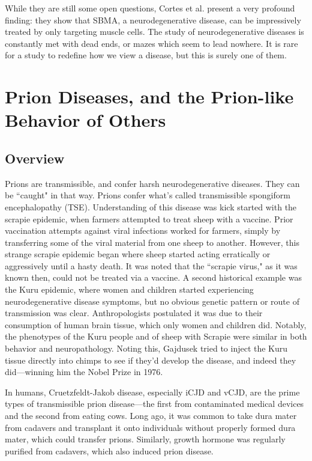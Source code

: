 While they are still some open questions, Cortes et al. present a very profound finding: they show that SBMA, a neurodegenerative disease, can be impressively treated by only targeting muscle cells. The study of neurodegenerative diseases is constantly met with dead ends, or mazes which seem to lead nowhere. It is rare for a study to redefine how we view a disease, but this is surely one of them.




\section{Prion Diseases, and the Prion-like Behavior of Others}

\subsection*{Overview}

Prions are transmissible, and confer harsh neurodegenerative diseases. They can be ``caught" in that way. Prions confer what's called transmissible spongiform encephalopathy (TSE). Understanding of this disease was kick started with the scrapie epidemic, when farmers attempted to treat sheep with a vaccine. Prior vaccination attempts against viral infections worked for farmers, simply by transferring some of the viral material from one sheep to another. However, this strange scrapie epidemic began where sheep started acting erratically or aggressively until a hasty death. It was noted that the ``scrapie virus," as it was known then, could not be treated via a vaccine. A second historical example was the Kuru epidemic, where women and children started experiencing neurodegenerative disease symptoms, but no obvious genetic pattern or route of transmission was clear. Anthropologists postulated it was due to their consumption of human brain tissue, which only women and children did. Notably, the phenotypes of the Kuru people and of sheep with Scrapie were similar in both behavior and neuropathology. Noting this, Gajdusek tried to inject the Kuru tissue directly into chimps to see if they'd develop the disease, and indeed they did---winning him the Nobel Prize in 1976.\newline

In humans, Cruetzfeldt-Jakob disease, especially iCJD and vCJD, are the prime types of transmissible prion disease---the first from contaminated medical devices and the second from eating cows. Long ago, it was common to take dura mater from cadavers and transplant it onto individuals without properly formed dura mater, which could transfer prions. Similarly, growth hormone was regularly purified from cadavers, which also induced prion disease. \newline

